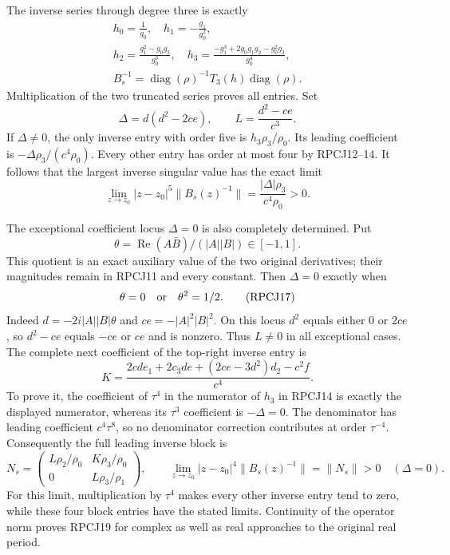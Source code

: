 \documentclass[11pt]{article}
\begin{document}
The inverse series through degree three is exactly
\[
 \begin{gathered}
 h_0=\frac1{g_0},\quad h_1=-\frac{g_1}{g_0^2},\\
 h_2=\frac{g_1^2-g_0g_2}{g_0^3},\quad
 h_3=\frac{-g_1^3+2g_0g_1g_2-g_0^2g_3}{g_0^4},\\
 B_s^{-1}=\operatorname{diag}(\rho)^{-1}T_3(h)
                               \operatorname{diag}(\rho).
 \end{gathered}
 \tag{RPCJ14}
\]
Multiplication of the two truncated series proves all entries.
Set
\[
       \Delta=d(d^2-2ce),\qquad L=\frac{d^2-ce}{c^3}.
 \tag{RPCJ15}
\]
If $\Delta\ne0$, the only inverse entry with order five is
$h_3\rho_3/\rho_0$. Its leading coefficient is
$-\Delta\rho_3/(c^4\rho_0)$.
Every other entry has order at most four by RPCJ12--14.
It follows that the largest inverse singular value has the exact
limit
\[
 \lim_{z\to z_0}|z-z_0|^5\|B_s(z)^{-1}\|
               =\frac{|\Delta|\rho_3}{c^4\rho_0}>0.
 \tag{RPCJ16}
\]

The exceptional coefficient locus $\Delta=0$ is also completely
determined. Put
\[\theta=\operatorname{Re}(A\bar B)/(|A||B|)\in[-1,1].\]
This quotient is an exact auxiliary value of the two original
derivatives; their magnitudes remain in RPCJ11 and every constant.
Then $\Delta=0$ exactly when
\[
        \theta=0\quad\hbox{or}\quad\theta^2=1/2.
 \tag{RPCJ17}
\]
Indeed $d=-2i|A||B|\theta$ and $ce=-|A|^2|B|^2$.
On this locus $d^2$ equals either $0$ or $2ce$, so
$d^2-ce$ equals $-ce$ or $ce$ and is nonzero.
Thus $L\ne0$ in all exceptional cases.
The complete next coefficient of the top-right inverse entry is
\[
 K=\frac{2cde_1+2c_3de+(2ce-3d^2)d_2-c^2f}{c^4}.
 \tag{RPCJ18}
\]
To prove it, the coefficient of $\tau^4$ in the numerator of
$h_3$ in RPCJ14 is exactly the displayed numerator, whereas its
$\tau^3$ coefficient is $-\Delta=0$. The denominator has leading
coefficient $c^4\tau^8$, so no denominator correction contributes
at order $\tau^{-4}$. Consequently the full leading inverse block is
\[
 N_s=\begin{pmatrix}
 L\rho_2/\rho_0&K\rho_3/\rho_0\\
 0&L\rho_3/\rho_1
 \end{pmatrix},\qquad
 \lim_{z\to z_0}|z-z_0|^4\|B_s(z)^{-1}\|=\|N_s\|>0
                   \quad(\Delta=0).
 \tag{RPCJ19}
\]
For this limit, multiplication by $\tau^4$ makes every other inverse
entry tend to zero, while these four block entries have the stated
limits. Continuity of the operator norm proves RPCJ19 for complex
as well as real approaches to the original real period.
\end{document}
